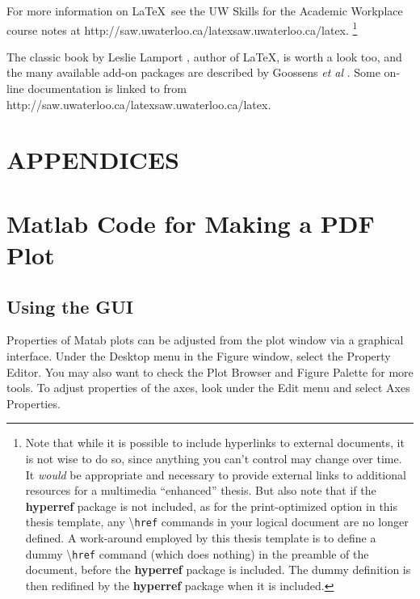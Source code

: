 \documentclass[letterpaper,12pt,titlepage,oneside,final]{report}
\newcommand{\package}[1]{\textbf{#1}} %
\newcommand{\cmmd}[1]{\textbackslash\texttt{#1}} %
\newcommand{\href}[1]{#1} %
\begin{document}
For more information on \LaTeX\, see the UW Skills for the Academic Workplace 
course notes at \href{http://saw.uwaterloo.ca/latex}{saw.uwaterloo.ca/latex}. 
\footnote{
  Note that while it is possible to include hyperlinks to external documents,
  it is not wise to do so, since anything you can't control may change over time. 
  It \emph{would} be appropriate and necessary to provide external links to 
  additional resources for a multimedia ``enhanced'' thesis. 
  But also note that if the \package{hyperref} package is not included, 
  as for the print-optimized option in this thesis template, any \cmmd{href} 
  commands in your logical document are no longer defined.
  A work-around employed by this thesis template is to define a dummy \cmmd{href} 
  command (which does nothing) in the preamble of the document, 
  before the \package{hyperref} package is included. 
  The dummy definition is then redifined by the
  \package{hyperref} package when it is included.
}

The classic book by Leslie Lamport \cite{lamport.book}, author of \LaTeX , is worth a look too, and the many available add-on packages are described by 
Goossens \textit{et al} \cite{goossens.book}. Some on-line documentation is linked
to from \href{http://saw.uwaterloo.ca/latex}{saw.uwaterloo.ca/latex}.

\appendix
\chapter*{APPENDICES}
\chapter[PDF Plots From Matlab]{Matlab Code for Making a PDF Plot}
\label{AppendixA}
\section{Using the GUI}
Properties of Matab plots can be adjusted from the plot window via a graphical interface. Under the Desktop menu in the Figure window, select the Property Editor. You may also want to check the Plot Browser and Figure Palette for more tools. To adjust properties of the axes, look under the Edit menu and select Axes Properties.
\end{document}
